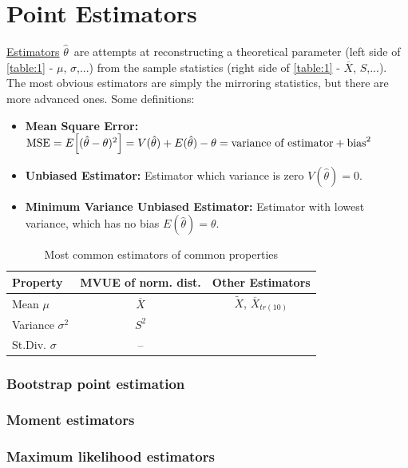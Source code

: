 \documentclass[12p,a4paper]{report}
\renewcommand{\bar}{\overline}
\begin{document}
\chapter{Point Estimators}
\underline{Estimators} $\hat{\theta}$ are attempts at reconstructing a theoretical parameter (left side of \ref{table:1} - $\mu$, $\sigma$,...) from the sample statistics (right side of \ref{table:1} - $\bar{X}$, $S$,...). The most obvious estimators are simply the mirroring statistics, but there are more advanced ones.
Some definitions:
\begin{itemize}
    \item \textbf{Mean Square Error:} $\text{MSE} = E\qty[(\hat{\theta} - \theta)^2] = V(\hat{\theta}) + E(\hat{\theta}) - \theta = \text{variance of estimator} + \text{bias}^2$
    \item \textbf{Unbiased Estimator:} Estimator which variance is zero $V(\hat{\theta}) = 0$.
    \item \textbf{Minimum Variance Unbiased Estimator:} Estimator with lowest variance, which has no bias $E(\hat{\theta}) = \theta$.
\end{itemize}

\begin{table}[H]
    \centering
    \begin{tabular}{l | c | c }
        \textbf{Property}    &  \textbf{MVUE of norm. dist.}  & Other Estimators \\ \midrule
        Mean $\mu$           & $\bar{X}$       & $\tilde{X}$, $\bar{X}_{tr(10)}$ \\ \midrule
        Variance $\sigma^2$  & $S^2$           & \\ \midrule
        St.Div. $\sigma$     & --              &
    \end{tabular}
    \caption{Most common estimators of common properties}
    \label{table:2}
\end{table}

\subsection*{Bootstrap point estimation}
\subsection*{Moment estimators}
\subsection*{Maximum likelihood estimators}
\end{document}
